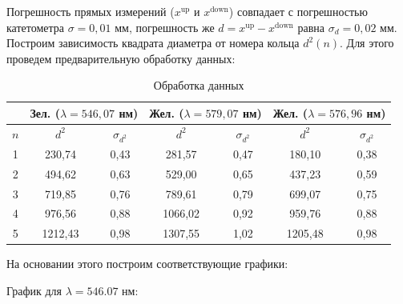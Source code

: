 \documentclass[a4paper,12pt]{extarticle}
\begin{document}
Погрешность прямых измерений ($x^{\text{up}}$ и $x^{\text{down}}$) совпадает с погрешностью катетометра $\sigma = 0,01$ мм, погрешность же $d = x^{\text{up}}-x^{\text{down}}$ равна $\sigma_d = 0,02$ мм.\\
Построим зависимость квадрата диаметра от номера кольца $d^2(n)$. Для этого проведем предварительную обработку данных:
\begin{table}[H]
\centering
\begin{tabular}{|c|cc|cc|cc|}
\hline
  & \multicolumn{2}{c|}{Зел. ($\lambda = 546,07$ нм)}                  & \multicolumn{2}{c|}{Жел. ($\lambda = 579,07$ нм)}               & \multicolumn{2}{c|}{Жел. ($\lambda = 576,96$ нм)}               \\ \hline
$n$ & \multicolumn{1}{c|}{$d^2$}       & $\sigma_{d^2}$ & \multicolumn{1}{c|}{$d^2$}       & $\sigma_{d^2}$ & \multicolumn{1}{c|}{$d^2$}       & $\sigma_{d^2}$ \\ \hline
1 & \multicolumn{1}{c|}{230,74}  & 0,43  & \multicolumn{1}{c|}{281,57}  & 0,47  & \multicolumn{1}{c|}{180,10}  & 0,38  \\ \hline
2 & \multicolumn{1}{c|}{494,62}  & 0,63  & \multicolumn{1}{c|}{529,00}  & 0,65  & \multicolumn{1}{c|}{437,23}  & 0,59  \\ \hline
3 & \multicolumn{1}{c|}{719,85}  & 0,76  & \multicolumn{1}{c|}{789,61}  & 0,79  & \multicolumn{1}{c|}{699,07}  & 0,75  \\ \hline
4 & \multicolumn{1}{c|}{976,56}  & 0,88  & \multicolumn{1}{c|}{1066,02} & 0,92  & \multicolumn{1}{c|}{959,76}  & 0,88  \\ \hline
5 & \multicolumn{1}{c|}{1212,43} & 0,98  & \multicolumn{1}{c|}{1307,55} & 1,02  & \multicolumn{1}{c|}{1205,48} & 0,98  \\ \hline
\end{tabular}
\caption{Обработка данных}
\end{table}
На основании этого построим соответствующие графики:

График для $\lambda = 546.07$ нм:
\begin{minipage}{0.6\textwidth}
\end{minipage}
\end{document}
